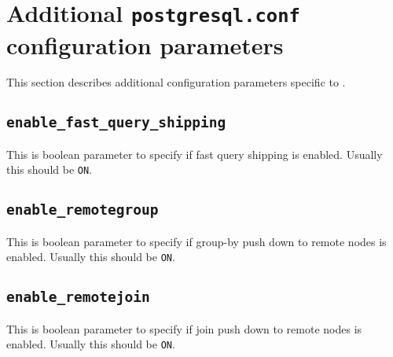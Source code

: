%
%



\section{\label{sec:GUC}Additional \texttt{postgresql.conf} configuration parameters}

  This section describes additional  configuration parameters specific to \XC.



\subsection*{\label{subsec:enableFQS}\texttt{enable\_fast\_query\_shipping}}

  This is boolean parameter to specify if fast query shipping is enabled.
  Usually this should be {\tt ON}.



\subsection*{\label{subsec:enableRemotegroup}\texttt{enable\_remotegroup}}

  This is boolean parameter to specify if group-by push down to remote nodes is enabled.
  Usually this should be {\tt ON}.



\subsection*{\label{subsec:enableRemotejoin}\texttt{enable\_remotejoin}}

  This is boolean parameter to specify if join push down to remote nodes is enabled.
  Usually this should be {\tt ON}.



